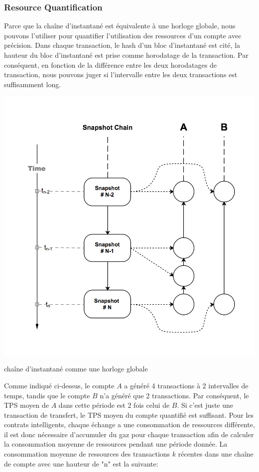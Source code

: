 \documentclass[UTF8,nofonts]{article}
\makeatletter
\newenvironment{figurehere}
 {\def\@captype{figure}}
 {}
\makeatother
\begin{document}
\begin{multicols}{2}
\subsubsection{Resource Quantification}
Parce que la chaîne d'instantané est équivalente à une horloge globale, nous pouvons l'utiliser pour quantifier l'utilisation des ressources d'un compte avec précision. Dans chaque transaction, le hash d'un bloc d'instantané est cité, la hauteur du bloc d'instantané est prise comme horodatage de la transaction. Par conséquent, en fonction de la différence entre les deux horodatages de transaction, nous pouvons juger si l'intervalle entre les deux transactions est suffisamment long.

\begin{center}
\begin{figurehere}
\includegraphics[width=.8\linewidth]{image/snapshotchain-clock.png}
\caption{chaîne d'instantané comme une horloge globale}
\end{figurehere}
\end{center}

Comme indiqué ci-dessus, le compte $A$ a généré 4 transactions à 2 intervalles de temps, tandis que le compte $B$ n'a généré que 2 transactions. Par conséquent, le TPS moyen de $A$ dans cette période est 2 fois celui de $B$. Si c'est juste une transaction de transfert, le TPS moyen du compte quantifié est suffisant. Pour les contrats intelligents, chaque échange a une consommation de ressources différente, il est donc nécessaire d'accumuler du gaz pour chaque transaction afin de calculer la consommation moyenne de ressources pendant une période donnée. La consommation moyenne de ressources des transactions $k$ récentes dans une chaîne de compte avec une hauteur de "n" est la suivante:


\end{multicols}
\end{document}
